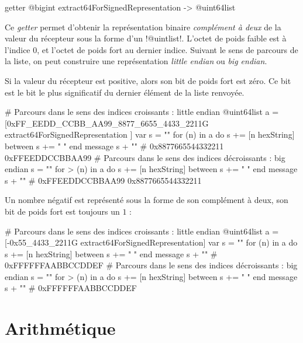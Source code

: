 
\begin{galgasbox}
getter @bigint extract64ForSignedRepresentation -> @uint64list
\end{galgasbox}

Ce \emph{getter} permet d'obtenir la représentation binaire \emph{complément à deux} de la valeur du récepteur sous la forme d'un \ggs!@uintlist!. L'octet de poids faible est à l'indice $0$, et l'octet de poids fort au dernier indice. Suivant le sens de parcours de la liste, on peut construire une représentation \emph{little endian} ou \emph{big endian}.

Si la valeur du récepteur est positive, alors son bit de poids fort est zéro. Ce bit est le bit le plus significatif du dernier élément de la liste renvoyée.

\begin{galgas}
# Parcours dans le sens des indices croissants : little endian
@uint64list a = [0xFF_EEDD_CCBB_AA99_8877_6655_4433_2211G
  extract64ForSignedRepresentation
]
var s = ""
for (n) in a
  do s += [n hexString]
  between s += " "
end
message s + "\n" # 0x8877665544332211 0xFFEEDDCCBBAA99
# Parcours dans le sens des indices décroissants : big endian
s = ""
for > (n) in a
  do s += [n hexString]
  between s += " "
end
message s + "\n" # 0xFFEEDDCCBBAA99 0x8877665544332211
\end{galgas}

Un nombre négatif est représenté sous la forme de son complément à deux, son bit de poids fort est toujours un $1$ : 

\begin{galgas}
# Parcours dans le sens des indices croissants : little endian
@uint64list a = [-0x55_4433_2211G extract64ForSignedRepresentation]
var s = ""
for (n) in a
  do s += [n hexString]
  between s += " "
end
message s + "\n" # 0xFFFFFFAABBCCDDEF
# Parcours dans le sens des indices décroissants : big endian
s = ""
for > (n) in a
  do s += [n hexString]
  between s += " "
end
message s + "\n" # 0xFFFFFFAABBCCDDEF
\end{galgas}














\section{Arithmétique}


